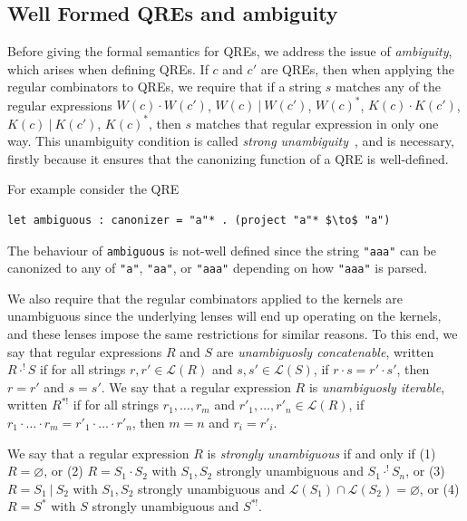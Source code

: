 \documentclass[acmsmall,review,anonymous]{acmart}\settopmatter{printfolios=true,printccs=false,printacmref=false}
\newcommand{\sep}{\ensuremath{\ | \ }}
\newcommand{\cd}[1]{\lstinline[backgroundcolor=\color{white}]$#1$}
\begin{document}
\subsection{Well Formed QREs and ambiguity}
Before giving the formal semantics for QREs, we address the issue of {\em
ambiguity}, which arises when defining QREs. If $c$ and  $c'$ are QREs, then
when applying the regular combinators to QREs, we require that if a string $s$
matches any of the regular expressions $W(c) \cdot W(c')$, $W(c) \sep W(c')$,
$W(c)^*$, $K(c) \cdot K(c')$, $K(c) \sep K(c')$, $K(c)^*$, then $s$ matches
that regular expression in only one way. This unambiguity condition is called
{\em strong unambiguity}~\cite{Sippu1988}, and is necessary, firstly because it
ensures that the canonizing function of a QRE is well-defined.

For example consider the QRE

\begin{lstlisting}
let ambiguous : canonizer = "a"* . (project "a"* $\to$ "a")
\end{lstlisting}

\noindent The behaviour of \cd{ambiguous} is not-well defined since the string
\cd{"aaa"} can be canonized to any of \cd{"a"}, \cd{"aa"}, or \cd{"aaa"} depending on how
\cd{"aaa"} is parsed.

We also require that the regular combinators applied to
the kernels are unambiguous since the underlying lenses will end up operating
on the kernels, and these lenses impose the same restrictions for similar
reasons.
%
To this end, we say that regular expressions $R$ and $S$ are
\textit{unambiguosly concatenable}, written $R \cdot^! S$ if for all strings
$r, r' \in \mathcal{L}(R)$ and $s, s' \in \mathcal{L}(S)$, if $r \cdot s = r'
\cdot s'$, then $r = r'$ and $s = s'$. We say that a regular expression $R$ is
\textit{unambiguosly iterable}, written $R^{*!}$ if for all strings $r_1,
\ldots, r_m$ and $r'_1, \ldots, r'_n \in \mathcal{L}(R)$, if $r_1 \cdot \ldots
\cdot r_m = r'_1 \cdot \ldots \cdot r'_n$, then $m = n$ and $r_i = r'_i$.

We say that a regular expression $R$ is \textit{strongly unambiguous} if and
only if (1) $R = \varnothing$, or (2) $R = S_1 \cdot S_2$ with $S_1, S_2$
strongly unambiguous and $S_1 \cdot^! S_n$, or (3) $R = S_1 \sep S_2$ with
$S_1, S_2$ strongly unambiguous and $\mathcal{L}(S_1) \cap \mathcal{L}(S_2) =
\varnothing$, or (4) $R = S^*$ with $S$ strongly unambiguous and $S^{*!}$.
\end{document}
